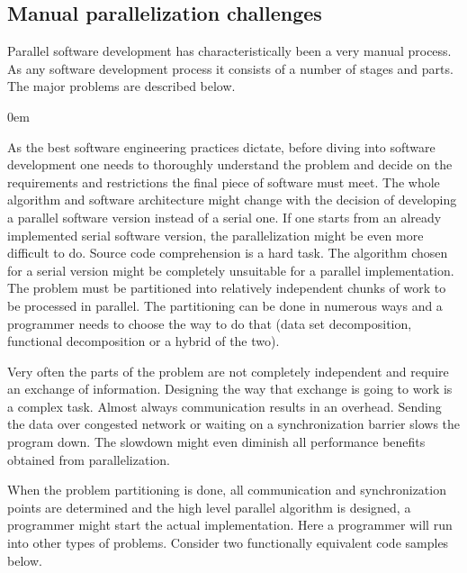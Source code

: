 \subsection{Manual parallelization challenges}
\label{background_challenges_manual}
\quad Parallel software development has characteristically been a very manual process. As any software development process it consists of a number of stages and parts. The major problems are described below.
\begin{description}[style=unboxed,leftmargin=0cm]
\itemsep0em
\item[Problem understanding and partitioning] As the best software engineering practices dictate, before diving into software development one needs to thoroughly understand the problem and decide on the requirements and restrictions the final piece of software must meet. The whole algorithm and software architecture might change with the decision of developing a parallel software version instead of a serial one. If one starts from an already implemented serial software version, the parallelization might be even more difficult to do. Source code comprehension is a hard task. The algorithm chosen for a serial version might be completely unsuitable for a parallel implementation. The problem must be partitioned into relatively independent chunks of work to be processed in parallel. The partitioning can be done in numerous ways and a programmer needs to choose the way to do that (data set decomposition, functional decomposition or a hybrid of the two).
\item[Communications and synchronization] Very often the parts of the problem are not completely independent and require an exchange of information. Designing the way that exchange is going to work is a complex task. Almost always communication results in an overhead. Sending the data over congested network or waiting on a synchronization barrier slows the program down. The slowdown might even diminish all performance benefits obtained from parallelization.
\item[Implementation and data dependencies] When the problem partitioning is done, all communication and synchronization points are determined and the high level parallel algorithm is designed, a programmer might start the actual implementation. Here a programmer will run into other types of problems. Consider two functionally equivalent code samples below.\newline\null
\begin{minipage}[t]{0.50\linewidth}
\begin{lstlisting}[caption={\raggedright Non-parallelizable loop with planted loop-carried data dependence.},label={lst:code_sample_data_dependence},language=C]

\end{lstlisting}
\end{minipage}
\end{description}

